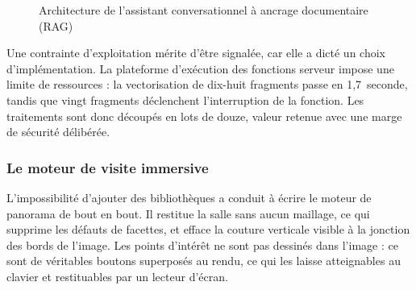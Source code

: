 \begin{figure}[htbp]
\centering
{}
\caption{Architecture de l'assistant conversationnel à ancrage documentaire (RAG)}
\label{fig:rag}
\end{figure}

Une contrainte d'exploitation mérite d'être signalée, car elle a dicté un choix
d'implémentation. La plateforme d'exécution des fonctions serveur impose une
limite de ressources : la vectorisation de dix-huit fragments passe en
1,7~seconde, tandis que vingt fragments déclenchent l'interruption de la
fonction. Les traitements sont donc découpés en lots de douze, valeur retenue
avec une marge de sécurité délibérée.

\subsubsection{Le moteur de visite immersive}

L'impossibilité d'ajouter des bibliothèques a conduit à écrire le moteur de
panorama de bout en bout. Il restitue la salle sans aucun maillage, ce qui
supprime les défauts de facettes, et efface la couture verticale visible à la
jonction des bords de l'image. Les points d'intérêt ne sont pas dessinés dans
l'image : ce sont de véritables boutons superposés au rendu, ce qui les laisse
atteignables au clavier et restituables par un lecteur d'écran.

